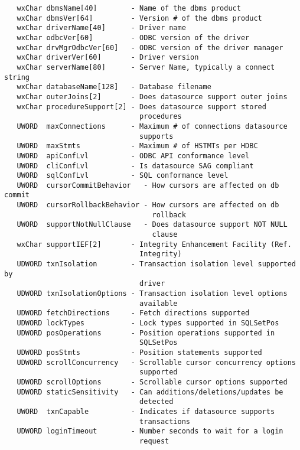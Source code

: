 \begin{verbatim}
   wxChar dbmsName[40]        - Name of the dbms product
   wxChar dbmsVer[64]         - Version # of the dbms product
   wxChar driverName[40]      - Driver name
   wxChar odbcVer[60]         - ODBC version of the driver
   wxChar drvMgrOdbcVer[60]   - ODBC version of the driver manager
   wxChar driverVer[60]       - Driver version
   wxChar serverName[80]      - Server Name, typically a connect string
   wxChar databaseName[128]   - Database filename
   wxChar outerJoins[2]       - Does datasource support outer joins
   wxChar procedureSupport[2] - Does datasource support stored
                                procedures
   UWORD  maxConnections      - Maximum # of connections datasource
                                supports
   UWORD  maxStmts            - Maximum # of HSTMTs per HDBC
   UWORD  apiConfLvl          - ODBC API conformance level
   UWORD  cliConfLvl          - Is datasource SAG compliant
   UWORD  sqlConfLvl          - SQL conformance level
   UWORD  cursorCommitBehavior   - How cursors are affected on db commit
   UWORD  cursorRollbackBehavior - How cursors are affected on db
                                   rollback
   UWORD  supportNotNullClause   - Does datasource support NOT NULL
                                   clause
   wxChar supportIEF[2]       - Integrity Enhancement Facility (Ref.
                                Integrity)
   UDWORD txnIsolation        - Transaction isolation level supported by
                                driver
   UDWORD txnIsolationOptions - Transaction isolation level options
                                available
   UDWORD fetchDirections     - Fetch directions supported
   UDWORD lockTypes           - Lock types supported in SQLSetPos
   UDWORD posOperations       - Position operations supported in
                                SQLSetPos
   UDWORD posStmts            - Position statements supported
   UDWORD scrollConcurrency   - Scrollable cursor concurrency options
                                supported
   UDWORD scrollOptions       - Scrollable cursor options supported
   UDWORD staticSensitivity   - Can additions/deletions/updates be
                                detected
   UWORD  txnCapable          - Indicates if datasource supports
                                transactions
   UDWORD loginTimeout        - Number seconds to wait for a login
                                request
\end{verbatim}



